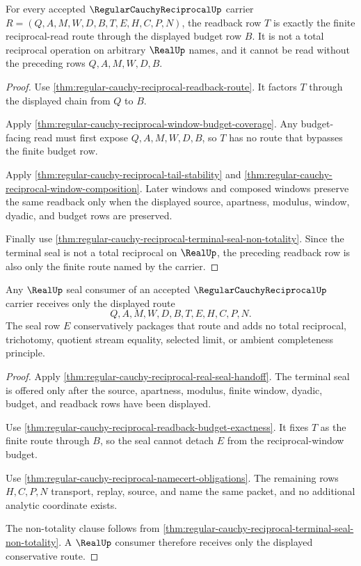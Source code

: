 \begin{theorem}
\label{thm:regular-cauchy-reciprocal-readback-budget-exactness}
For every accepted $\RegularCauchyReciprocalUp$ carrier $R=(Q,A,M,W,D,B,T,E,H,C,P,N)$, the readback row $T$ is exactly the finite reciprocal-read route through the displayed budget row $B$. It is not a total reciprocal operation on arbitrary $\RealUp$ names, and it cannot be read without the preceding rows $Q,A,M,W,D,B$.
\end{theorem}
\begin{proof}
Use \autoref{thm:regular-cauchy-reciprocal-readback-route}. It factors $T$ through the displayed chain from $Q$ to $B$.

Apply \autoref{thm:regular-cauchy-reciprocal-window-budget-coverage}. Any budget-facing read must first expose $Q,A,M,W,D,B$, so $T$ has no route that bypasses the finite budget row.

Apply \autoref{thm:regular-cauchy-reciprocal-tail-stability} and \autoref{thm:regular-cauchy-reciprocal-window-composition}. Later windows and composed windows preserve the same readback only when the displayed source, apartness, modulus, window, dyadic, and budget rows are preserved.

Finally use \autoref{thm:regular-cauchy-reciprocal-terminal-seal-non-totality}. Since the terminal seal is not a total reciprocal on $\RealUp$, the preceding readback row is also only the finite route named by the carrier.
\end{proof}

\begin{theorem}
\label{thm:regular-cauchy-reciprocal-seal-route-conservativity}
Any $\RealUp$ seal consumer of an accepted $\RegularCauchyReciprocalUp$ carrier receives only the displayed route
$$
Q,A,M,W,D,B,T,E,H,C,P,N .
$$
The seal row $E$ conservatively packages that route and adds no total reciprocal, trichotomy, quotient stream equality, selected limit, or ambient completeness principle.
\end{theorem}
\begin{proof}
Apply \autoref{thm:regular-cauchy-reciprocal-real-seal-handoff}. The terminal seal is offered only after the source, apartness, modulus, finite window, dyadic, budget, and readback rows have been displayed.

Use \autoref{thm:regular-cauchy-reciprocal-readback-budget-exactness}. It fixes $T$ as the finite route through $B$, so the seal cannot detach $E$ from the reciprocal-window budget.

Use \autoref{thm:regular-cauchy-reciprocal-namecert-obligations}. The remaining rows $H,C,P,N$ transport, replay, source, and name the same packet, and no additional analytic coordinate exists.

The non-totality clause follows from \autoref{thm:regular-cauchy-reciprocal-terminal-seal-non-totality}. A $\RealUp$ consumer therefore receives only the displayed conservative route.
\end{proof}

